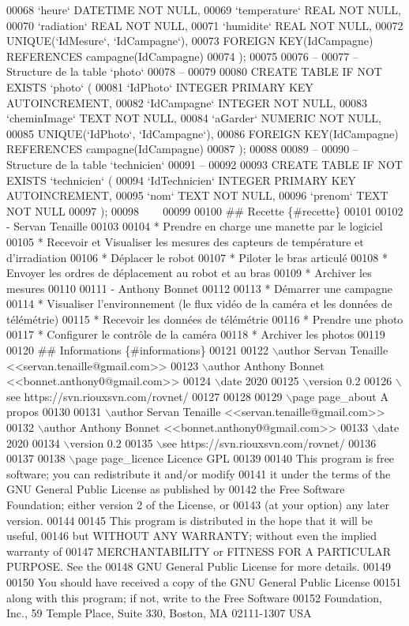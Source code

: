 \begin{DoxyCode}
00068    `heure` DATETIME NOT NULL,
00069    `temperature`   REAL NOT NULL,
00070    `radiation` REAL NOT NULL,
00071    `humidite`  REAL NOT NULL,  
00072    UNIQUE(`IdMesure`, `IdCampagne`),
00073    FOREIGN KEY(IdCampagne) REFERENCES campagne(IdCampagne)
00074 );
00075 
00076 --
00077 -- Structure de la table `photo`
00078 --
00079 
00080 CREATE TABLE IF NOT EXISTS `photo` (
00081    `IdPhoto`   INTEGER PRIMARY KEY AUTOINCREMENT,
00082    `IdCampagne`    INTEGER NOT NULL,
00083    `cheminImage`   TEXT NOT NULL,
00084    `aGarder`   NUMERIC NOT NULL,
00085    UNIQUE(`IdPhoto`, `IdCampagne`),
00086    FOREIGN KEY(IdCampagne) REFERENCES campagne(IdCampagne) 
00087 );
00088 
00089 --
00090 -- Structure de la table `technicien`
00091 --
00092 
00093 CREATE TABLE IF NOT EXISTS `technicien` (
00094    `IdTechnicien`  INTEGER PRIMARY KEY AUTOINCREMENT,
00095    `nom`   TEXT NOT NULL,
00096    `prenom`    TEXT NOT NULL
00097 );
00098 ~~~
00099 
00100 ## Recette \{#recette\}
00101 
00102 - Servan Tenaille
00103 
00104     * Prendre en charge une manette par le logiciel
00105     * Recevoir et Visualiser les mesures des capteurs de température et d'irradiation
00106     * Déplacer le robot
00107     * Piloter le bras articulé
00108     * Envoyer les ordres de déplacement au robot et au bras
00109     * Archiver les mesures
00110 
00111 - Anthony Bonnet
00112 
00113     * Démarrer une campagne
00114     * Visualiser l'environnement (le flux vidéo de la caméra et les données de télémétrie)
00115     * Recevoir les données de télémétrie
00116     * Prendre une photo
00117     * Configurer le contrôle de la caméra
00118     * Archiver les photos
00119 
00120 ## Informations \{#informations\}
00121 
00122 \(\backslash\)author Servan Tenaille <<servan.tenaille@gmail.com>>
00123 \(\backslash\)author Anthony Bonnet <<bonnet.anthony0@gmail.com>>
00124 \(\backslash\)date 2020
00125 \(\backslash\)version 0.2
00126 \(\backslash\)see https://svn.riouxsvn.com/rovnet/
00127 
00128 
00129 \(\backslash\)page page\_about A propos
00130 
00131 \(\backslash\)author Servan Tenaille <<servan.tenaille@gmail.com>>
00132 \(\backslash\)author Anthony Bonnet <<bonnet.anthony0@gmail.com>>
00133 \(\backslash\)date 2020
00134 \(\backslash\)version 0.2
00135 \(\backslash\)see https://svn.riouxsvn.com/rovnet/
00136 
00137 
00138 \(\backslash\)page page\_licence Licence GPL
00139 
00140 This program is free software; you can redistribute it and/or modify
00141 it under the terms of the GNU General Public License as published by
00142 the Free Software Foundation; either version 2 of the License, or
00143 (at your option) any later version.
00144 
00145 This program is distributed in the hope that it will be useful,
00146 but WITHOUT ANY WARRANTY; without even the implied warranty of
00147 MERCHANTABILITY or FITNESS FOR A PARTICULAR PURPOSE. See the
00148 GNU General Public License for more details.
00149 
00150 You should have received a copy of the GNU General Public License
00151 along with this program; if not, write to the Free Software
00152 Foundation, Inc., 59 Temple Place, Suite 330, Boston, MA 02111-1307 USA
\end{DoxyCode}
